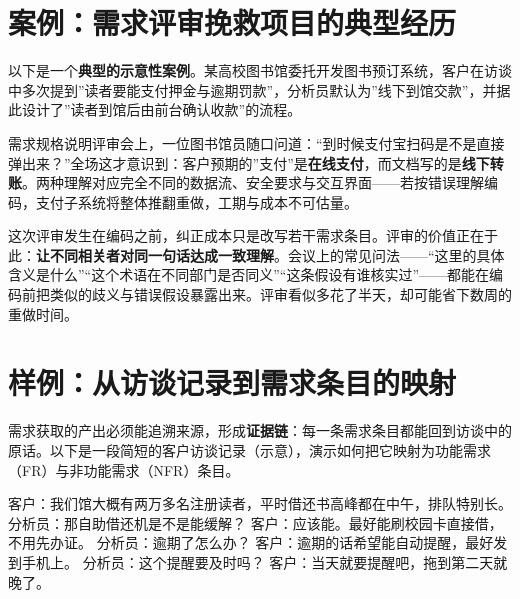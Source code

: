 \documentclass[12pt,a4paper,twoside,openany]{ctexbook}
\numberwithin{figure}{chapter}
\numberwithin{table}{chapter}
\newenvironment{Shaded}{}{}
\newcommand{\NormalTok}[1]{#1}
\begin{document}
\section{案例：需求评审挽救项目的典型经历}\label{ux6848ux4f8bux9700ux6c42ux8bc4ux5ba1ux633dux6551ux9879ux76eeux7684ux5178ux578bux7ecfux5386}

以下是一个\textbf{典型的示意性案例}。某高校图书馆委托开发图书预订系统，客户在访谈中多次提到''读者要能支付押金与逾期罚款''，分析员默认为''线下到馆交款''，并据此设计了''读者到馆后由前台确认收款''的流程。

需求规格说明评审会上，一位图书馆员随口问道：``到时候支付宝扫码是不是直接弹出来？''全场这才意识到：客户预期的''支付''是\textbf{在线支付}，而文档写的是\textbf{线下转账}。两种理解对应完全不同的数据流、安全要求与交互界面------若按错误理解编码，支付子系统将整体推翻重做，工期与成本不可估量。

这次评审发生在编码之前，纠正成本只是改写若干需求条目。评审的价值正在于此：\textbf{让不同相关者对同一句话达成一致理解}。会议上的常见问法------``这里的具体含义是什么''``这个术语在不同部门是否同义''``这条假设有谁核实过''------都能在编码前把类似的歧义与错误假设暴露出来。评审看似多花了半天，却可能省下数周的重做时间。

\section{样例：从访谈记录到需求条目的映射}\label{ux6837ux4f8bux4eceux8bbfux8c08ux8bb0ux5f55ux5230ux9700ux6c42ux6761ux76eeux7684ux6620ux5c04}

需求获取的产出必须能追溯来源，形成\textbf{证据链}：每一条需求条目都能回到访谈中的原话。以下是一段简短的客户访谈记录（示意），演示如何把它映射为功能需求（FR）与非功能需求（NFR）条目。

\begin{Shaded}
\begin{Highlighting}[]
\NormalTok{客户：我们馆大概有两万多名注册读者，平时借还书高峰都在中午，排队特别长。}
\NormalTok{分析员：那自助借还机是不是能缓解？}
\NormalTok{客户：应该能。最好能刷校园卡直接借，不用先办证。}
\NormalTok{分析员：逾期了怎么办？}
\NormalTok{客户：逾期的话希望能自动提醒，最好发到手机上。}
\NormalTok{分析员：这个提醒要及时吗？}
\NormalTok{客户：当天就要提醒吧，拖到第二天就晚了。}
\end{Highlighting}
\end{Shaded}
\end{document}
